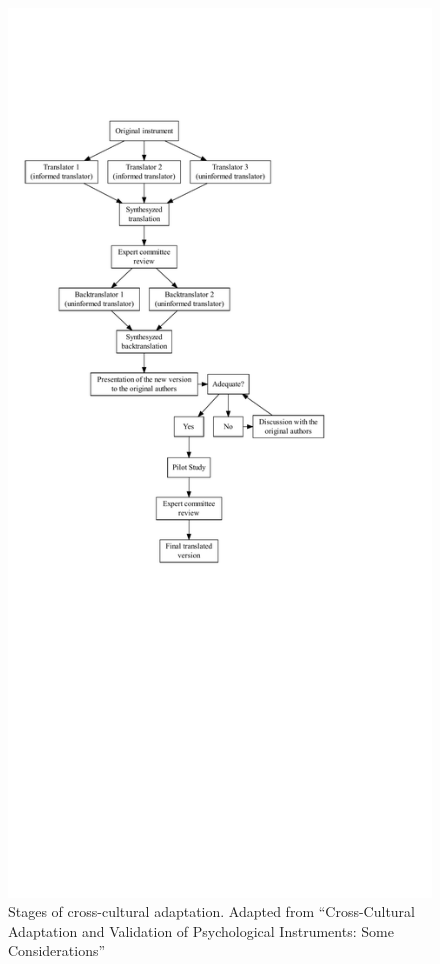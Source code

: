 \documentclass[
  ,doc,11pt, twoside,floatsintext]{apa6}
\begin{document}
\begin{figure}

{\centering \includegraphics[width=1\linewidth]{main_files/figure-latex/flowcca2-1} 

}

\caption{Stages of cross-cultural adaptation. Adapted from “Cross-Cultural Adaptation and Validation of Psychological Instruments: Some Considerations”}\label{fig:flowcca2}
\end{figure}
\end{document}
